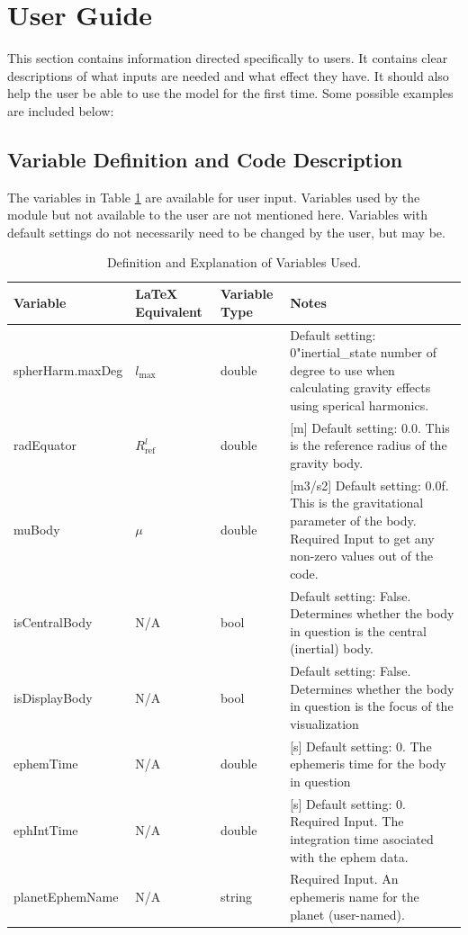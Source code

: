 \section{User Guide}
This section contains information directed specifically to users. It contains clear descriptions of what inputs are needed and what effect they have. It should also help the user be able to use the model for the first time. Some possible examples are included below:

\subsection{Variable Definition and Code Description}
The variables in Table \ref{tabular:vars} are available for user input. Variables used by the module but not available to the user are not mentioned here. Variables with default settings do not necessarily need to be changed by the user, but may be.
\begin{table}[H]
	\caption{Definition and Explanation of Variables Used.}
	\label{tab:errortol}
	\centering \fontsize{10}{10}\selectfont
	\begin{tabular}{ | m{3cm}| m{3cm} | m{3cm} | m{6cm} |} %
		\hline
		\textbf{Variable}   							& \textbf{LaTeX Equivalent} 	&		\textbf{Variable Type} & \textbf{Notes}			  \\ \hline
		spherHarm.maxDeg					&$l_{\text{max}}$		 	  & double & Default setting: 0"inertial\_state number of degree to use when calculating gravity effects using sperical harmonics.\\ \hline
		radEquator			   & $R_{\mathrm{ref}}^{l}$			& double & [m] Default setting: 0.0. 	This is the reference radius of the gravity body.\\ \hline
		muBody					& $\mu$ 		& double & [m3/s2] Default setting: 0.0f. This is the gravitational parameter of the body. Required Input to get any non-zero values out of the code.\\ \hline
		isCentralBody & N/A & bool & Default setting: False. Determines whether the body in question is the central (inertial) body.\\ \hline
		isDisplayBody & N/A & bool & Default setting: False. Determines whether the body in question is the focus of the visualization\\ \hline
		ephemTime & N/A & double & [s] Default setting: 0. The ephemeris time for the body in question \\ \hline
		ephIntTime & N/A & double & [s] Default setting: 0. Required Input. The integration time asociated with the ephem data. \\ \hline
		planetEphemName & N/A & string & Required Input. An ephemeris name for the planet (user-named). \\ \hline
	\end{tabular}
	\label{tabular:vars}
\end{table}

